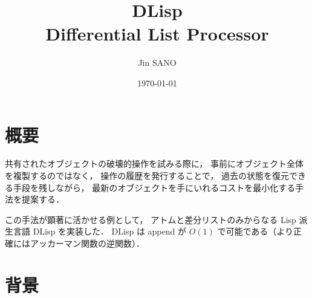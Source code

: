 \documentclass[10pt, a4j, twocolumn]{scrartcl}
\author{Jin SANO}
\date{\today}
\title{DLisp\\\medskip
\large Differential List Processor}
\begin{document}
\maketitle
\tableofcontents




\section{概要}
\label{sec:orga2eca21}

共有されたオブジェクトの破壊的操作を試みる際に，
事前にオブジェクト全体を複製するのではなく，
操作の履歴を発行することで，
過去の状態を復元できる手段を残しながら，
最新のオブジェクトを手にいれるコストを最小化する手法を提案する．

この手法が顕著に活かせる例として，
アトムと差分リストのみからなる Lisp 派生言語 DLisp を実装した．
DLisp は append が \(O(1)\) で可能である（より正確にはアッカーマン関数の逆関数）．


\section{背景}
\label{sec:orgea18153}
\end{document}
